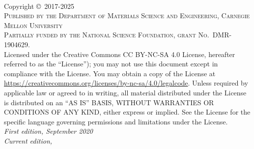 
\newpage
~\vfill
\thispagestyle{empty}

\noindent Copyright \copyright\ 2017-2025\\ %

\noindent \textsc{Published by the Department of Materials Science and Engineering, Carnegie Mellon University}\\ %

\noindent \textsc{Partially funded by the National Science Foundation, grant No.\ DMR-1904629.}\\ 


\noindent Licensed under the Creative Commons CC BY-NC-SA 4.0 License, hereafter referred to as the ``License''); you may not
use this document except in compliance with the License. You may obtain a copy
of the License at \url{https://creativecommons.org/licenses/by-nc-sa/4.0/legalcode}. Unless
required by applicable law or agreed to in writing, all material distributed
under the License is distributed on an ``AS IS'' BASIS, WITHOUT
WARRANTIES OR CONDITIONS OF ANY KIND, either express or implied. See the
License for the specific language governing permissions and limitations
under the License.\\ %

\noindent \textit{First edition, September 2020}\\ %
\noindent \textit{Current edition, \monthyear}

\clearpage
\processauthors

\clearpage

